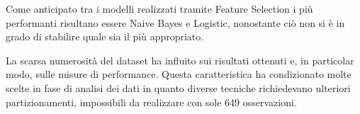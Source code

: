\documentclass[12pt,a4paper]{report}
\begin{document}
\begin{multicols}{2}
Come anticipato tra i modelli realizzati tramite Feature Selection i più performanti risultano essere Naive Bayes e Logistic, nonostante ciò non si è in grado di stabilire quale sia il più appropriato. 

La scarsa numerosità del dataset ha influito sui risultati ottenuti e, in particolar modo, sulle misure di performance. Questa caratteristica ha condizionato molte scelte in fase di analisi dei dati in quanto diverse tecniche richiedevano ulteriori partizionamenti, impossibili da realizzare con sole 649 osservazioni. 

\end{multicols}
	
\end{document}
